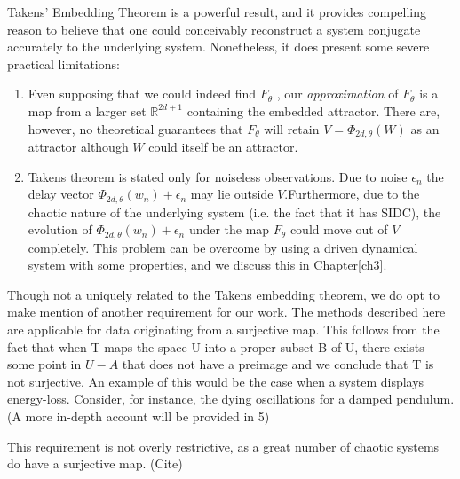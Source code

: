 \documentclass[a4paper,12pt,twoside]{report}
\begin{document}
Takens' Embedding Theorem is a powerful result, and it provides compelling reason to believe that one could conceivably reconstruct a system conjugate accurately to the underlying system. Nonetheless, it does present some severe practical limitations:
\vspace{-5mm}
\begin{enumerate}
\item Even supposing that we could indeed find $F_\theta$ , our \emph{approximation} of  $F_\theta$ is a map from a larger set $\mathbb{R}^{2d+1}$ containing the embedded attractor. There are, however, no theoretical guarantees that $F_\theta$ will retain  $V=\Phi_{2d,\theta}(W)$  as an attractor although $W$ could itself be an attractor.
\item Takens theorem is stated only for noiseless observations. Due to noise $\epsilon_n$ the delay vector $\Phi_{2d,\theta}(w_n) + \epsilon_n$  may lie outside $V$.Furthermore, due to the chaotic nature of the underlying system (i.e. the fact that it has SIDC), the evolution of $\Phi_{2d,\theta}(w_n) + \epsilon_n$ under the map $F_\theta$ could move out of $V$ completely. This problem can be overcome  by using a driven dynamical system with some properties, and we discuss this in Chapter\ref{ch3}. 
\end{enumerate}



Though not a uniquely related to the Takens embedding theorem, we do opt to make mention of another requirement for our work. 
The methods described here are applicable for data originating from a surjective map. 
This follows from the fact that when T maps the space U into a proper subset B of U, there exists some point in $U - A$ that does not have a preimage and we conclude that T is not surjective. 
An example of this would be the case when a system displays energy-loss. Consider, for instance, the dying oscillations for a damped pendulum. (A more in-depth account will be provided in 5)

This requirement is not overly restrictive, as a great number of chaotic systems do have a surjective map. (Cite) 
\end{document}
